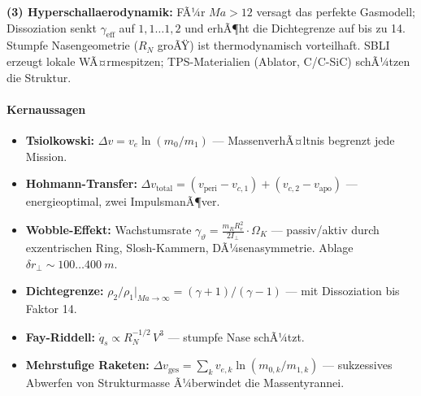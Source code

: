 ﻿\documentclass[12pt,a4paper]{article}
\newcommand{\Dv}{\Delta v}
\newcommand{\Ma}{M\!a}
\begin{document}
\textbf{(3) Hyperschallaerodynamik:} FÃ¼r $\Ma > 12$ versagt das perfekte Gasmodell;
Dissoziation senkt $\gamma_{\mathrm{eff}}$ auf $1{,}1\ldots1{,}2$ und erhÃ¶ht die
Dichtegrenze auf bis zu 14. Stumpfe Nasengeometrie ($R_N$ groÃŸ) ist thermodynamisch
vorteilhaft. SBLI erzeugt lokale WÃ¤rmespitzen; TPS-Materialien (Ablator, C/C-SiC)
schÃ¼tzen die Struktur.

\bigskip
\paragraph*{Kernaussagen}
\begin{itemize}[leftmargin=*]
  \item \textbf{Tsiolkowski:}
    $\Dv = v_e\ln(m_0/m_1)$ --- MassenverhÃ¤ltnis begrenzt jede Mission.
  \item \textbf{Hohmann-Transfer:}
    $\Dv_{\mathrm{total}} = (v_{\mathrm{peri}}-v_{c,1}) + (v_{c,2}-v_{\mathrm{apo}})$
    --- energieoptimal, zwei ImpulsmanÃ¶ver.
  \item \textbf{Wobble-Effekt:}
    Wachstumsrate
    $\gamma_\vartheta = \tfrac{m_R R_e^2}{2I_\perp}\cdot\Omega_K$ ---
    passiv/aktiv durch exzentrischen Ring, Slosh-Kammern, DÃ¼senasymmetrie.
    Ablage $\delta r_\perp \sim 100\ldots\SI{400}{m}$.
  \item \textbf{Dichtegrenze:}
    $\rho_2/\rho_1|_{\Ma\to\infty} = (\gamma+1)/(\gamma-1)$ ---
    mit Dissoziation bis Faktor 14.
  \item \textbf{Fay-Riddell:}
    $\dot{q}_s \propto R_N^{-1/2}\,V^3$ --- stumpfe Nase schÃ¼tzt.
  \item \textbf{Mehrstufige Raketen:}
    $\Dv_{\mathrm{ges}} = \sum_k v_{e,k}\ln(m_{0,k}/m_{1,k})$ ---
    sukzessives Abwerfen von Strukturmasse Ã¼berwindet die Massentyrannei.
\end{itemize}
\end{document}
